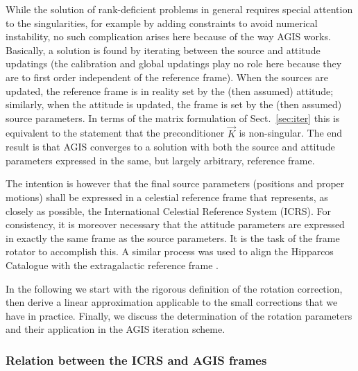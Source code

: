 \documentclass[structabstract]{aa}
\begin{document}
While the solution of rank-deficient problems in general requires special 
attention to the singularities, for example by adding constraints to avoid 
numerical instability, no such complication arises here because of the 
way AGIS works. Basically, a solution is found by iterating between the 
source and attitude updatings (the calibration and global updatings play 
no role here because they are to first order independent of the reference 
frame). When the sources are updated, the reference frame is in reality 
set by the (then assumed) attitude; similarly, when the attitude is updated, 
the frame is set by the (then assumed) source parameters. In terms of the
matrix formulation of Sect.~\ref{sec:iter} this is equivalent to the statement
that the preconditioner $\vec{K}$ is non-singular. The end result 
is that AGIS converges to a solution with both the source and attitude 
parameters expressed in the same, but largely arbitrary, reference frame.

The intention is however that the final source parameters (positions and 
proper motions) shall be expressed in a celestial reference frame that 
represents, as closely as possible, the International Celestial Reference 
System (ICRS). For consistency, it is moreover necessary that the attitude 
parameters are expressed in exactly the same frame as the source parameters. 
It is the task of the frame rotator to accomplish this. A similar process 
was used to align the Hipparcos Catalogue with the extragalactic reference 
frame \citep{ndac1995}. 

In the following we start with the rigorous definition of the rotation correction,
then derive a linear approximation applicable to the small corrections that
we have in practice. Finally, we discuss the determination of the rotation 
parameters and their application in the AGIS iteration scheme. 


\subsubsection{Relation between the ICRS and AGIS frames}\label{sec:framerel}
\end{document}
